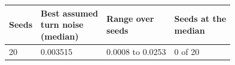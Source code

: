 \begin{tabular}{llll}
\toprule
Seeds & \shortstack[l]{Best assumed\\turn noise\\(median)} & \shortstack[l]{Range over\\seeds} & \shortstack[l]{Seeds at the\\median} \\
\midrule
20 & 0.003515 & 0.0008 to 0.0253 & 0 of 20 \\
\bottomrule
\end{tabular}
